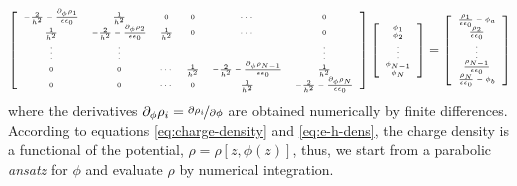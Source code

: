 \begin{equation}
\tiny
	\left[ 
		\begin{array}{cccccc}
 			-\frac{2}{h^2}-\frac{\partial_{\phi} \rho_1}{\epsilon \epsilon_0} & \frac{1}{h^2} & 0 & 0 & \cdots & 0 \\
 			\frac{1}{h^2} & -\frac{2}{h^2}-\frac{\partial_{\phi} \rho_2}{\epsilon \epsilon_0} & \frac{1}{h^2} & 0 & \cdots & 0 \\
 			\vdots & \vdots &  & &  & \vdots \\
 			0 & 0 & \cdots & \frac{1}{h^2} & -\frac{2}{h^2}-\frac{\partial_{\phi} \rho_{N-1}}{\epsilon \epsilon_0} & \frac{1}{h^2} \\
 			0 & 0 & \cdots & 0 & \frac{1}{h^2} & -\frac{2}{h^2}-\frac{\partial_{\phi} \rho_N}{\epsilon \epsilon_0}
		\end{array} 
	\right] 
	\left[
		\begin{array}{c} 
			\phi_1 \\ 
			\phi_2 \\ 
			\vdots \\ 
			\phi_{N-1} \\
			\phi_N 
		\end{array} 
	\right] 
	= 
	\left[
		\begin{array}{c}
			\frac{\rho_1}{\epsilon \epsilon_0} - \phi_a \\ 
			\frac{\rho_2}{\epsilon \epsilon_0} \\ 
			\vdots \\ 
			\frac{\rho_{N-1}}{\epsilon \epsilon_0} \\
			\frac{\rho_N}{\epsilon \epsilon_0} - \phi_b
		\end{array}
	\right]
	\normalsize
	\label{eq:matrix-euller-lagrange}
\end{equation}
where the derivatives $\partial_{\phi} \rho_i =\nicefrac{\partial \rho_i}{\partial \phi}$ are obtained numerically by finite differences. According to equations \ref{eq:charge-density} and \ref{eq:e-h-dens}, the charge density is a functional of the potential, $\rho = \rho[z,\phi(z)]$, thus, we start from a parabolic \textit{ansatz} for $\phi$ and evaluate $\rho$ by numerical integration.
